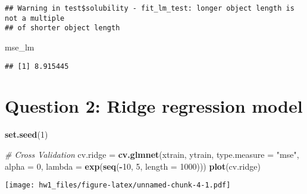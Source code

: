 \documentclass[
]{article}
\newenvironment{Shaded}{\begin{snugshade}}{\end{snugshade}}
\newcommand{\CommentTok}[1]{\textcolor[rgb]{0.56,0.35,0.01}{\textit{#1}}}
\newcommand{\DataTypeTok}[1]{\textcolor[rgb]{0.13,0.29,0.53}{#1}}
\newcommand{\DecValTok}[1]{\textcolor[rgb]{0.00,0.00,0.81}{#1}}
\newcommand{\KeywordTok}[1]{\textcolor[rgb]{0.13,0.29,0.53}{\textbf{#1}}}
\newcommand{\NormalTok}[1]{#1}
\newcommand{\OperatorTok}[1]{\textcolor[rgb]{0.81,0.36,0.00}{\textbf{#1}}}
\newcommand{\StringTok}[1]{\textcolor[rgb]{0.31,0.60,0.02}{#1}}
\begin{document}
\begin{Shaded}
\end{Shaded}

\begin{verbatim}
## Warning in test$solubility - fit_lm_test: longer object length is not a multiple
## of shorter object length
\end{verbatim}

\begin{Shaded}
\begin{Highlighting}[]
\NormalTok{mse_lm}
\end{Highlighting}
\end{Shaded}

\begin{verbatim}
## [1] 8.915445
\end{verbatim}

\hypertarget{question-2-ridge-regression-model}{%
\section{Question 2: Ridge regression
model}\label{question-2-ridge-regression-model}}

\begin{Shaded}
\begin{Highlighting}[]
\KeywordTok{set.seed}\NormalTok{(}\DecValTok{1}\NormalTok{)}

\CommentTok{# Cross Validation}
\NormalTok{cv.ridge =}\StringTok{ }\KeywordTok{cv.glmnet}\NormalTok{(xtrain, ytrain, }
                     \DataTypeTok{type.measure =} \StringTok{"mse"}\NormalTok{,}
                     \DataTypeTok{alpha =} \DecValTok{0}\NormalTok{,}
                     \DataTypeTok{lambda =} \KeywordTok{exp}\NormalTok{(}\KeywordTok{seq}\NormalTok{(}\OperatorTok{-}\DecValTok{10}\NormalTok{, }\DecValTok{5}\NormalTok{, }\DataTypeTok{length =} \DecValTok{1000}\NormalTok{)))}
\KeywordTok{plot}\NormalTok{(cv.ridge)}
\end{Highlighting}
\end{Shaded}

\texttt{[image: hw1\_files/figure-latex/unnamed-chunk-4-1.pdf]}
\end{document}
